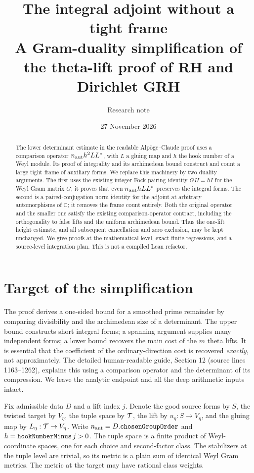 \documentclass[11pt]{article}
\title{\vspace{-1.5em}\textbf{The integral adjoint without a tight frame}\\[.45em]\large A Gram-duality simplification of the theta-lift proof of RH and Dirichlet GRH}
\author{Research note}
\date{27 November 2026}
\theoremstyle{remark}\newtheorem{remark}[theorem]{Remark}
\newcommand{\C}{\mathbb C}\newcommand{\Z}{\mathbb Z}\newcommand{\Q}{\mathbb Q}
\newcommand{\code}[1]{\texttt{\detokenize{#1}}}
\begin{document}
\maketitle
\begin{abstract}
The lower determinant estimate in the readable Alp\"oge--Claude proof uses a comparison operator $n_{\rm aut}h^2LL^*$, with $L$ a gluing map and $h$ the hook number of a Weyl module. Its proof of integrality and its archimedean bound construct and count a large tight frame of auxiliary forms. We replace this machinery by two duality arguments. The first uses the existing integer Fock-pairing identity $GH=hI$ for the Weyl Gram matrix $G$; it proves that even $n_{\rm aut}hLL^*$ preserves the integral forms. The second is a paired-conjugation norm identity for the adjoint at arbitrary automorphisms of $\C$; it removes the frame count entirely. Both the original operator and the smaller one satisfy the existing comparison-operator contract, including the orthogonality to false lifts and the uniform archimedean bound. Thus the one-lift height estimate, and all subsequent cancellation and zero exclusion, may be kept unchanged. We give proofs at the mathematical level, exact finite regressions, and a source-level integration plan. This is not a compiled Lean refactor.
\end{abstract}
\tableofcontents
\section{Target of the simplification}

The proof derives a one-sided bound for a smoothed prime remainder by comparing divisibility and the archimedean size of a determinant. The upper bound constructs short integral forms; a spanning argument supplies many independent forms; a lower bound recovers the main cost of the $m$ theta lifts. It is essential that the coefficient of the ordinary-direction cost is recovered \emph{exactly}, not approximately. The detailed human-readable guide, Section 12 (source lines 1163--1262), explains this using a comparison operator and the determinant of its compression. We leave the analytic endpoint and all the deep arithmetic inputs intact.

Fix admissible data $D$ and a lift index $j$. Denote the good source forms by $S$, the twisted target by $V_\eta$, the tuple space by $\mathcal T$, the lift by $u_\eta:S\to V_\eta$, and the gluing map by $L_\eta:\mathcal T\to V_\eta$. Write $n_{\rm aut}=D.\code{chosenGroupOrder}$ and $h=\code{hookNumberMinus}\,j>0$. The tuple space is a finite product of Weyl-coordinate spaces, one for each choice and second-factor class. The stabilizers at the tuple level are trivial, so its metric is a plain sum of identical Weyl Gram metrics. The metric at the target may have rational class weights.
\end{document}
